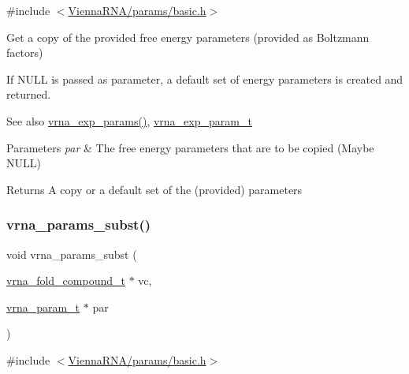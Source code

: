 {\ttfamily \#include $<$\mbox{\hyperlink{params_2basic_8h}{Vienna\+R\+N\+A/params/basic.\+h}}$>$}



Get a copy of the provided free energy parameters (provided as Boltzmann factors) 

If N\+U\+LL is passed as parameter, a default set of energy parameters is created and returned.

\begin{DoxySeeAlso}{See also}
\mbox{\hyperlink{group__energy__parameters_gab1f3016f96aa96bff020cdd904605afa}{vrna\+\_\+exp\+\_\+params()}}, \mbox{\hyperlink{group__energy__parameters_ga01d8b92fe734df8d79a6169482c7d8d8}{vrna\+\_\+exp\+\_\+param\+\_\+t}}
\end{DoxySeeAlso}

\begin{DoxyParams}{Parameters}
{\em par} & The free energy parameters that are to be copied (Maybe N\+U\+LL) \\
\hline
\end{DoxyParams}
\begin{DoxyReturn}{Returns}
A copy or a default set of the (provided) parameters 
\end{DoxyReturn}
\mbox{\label{group__energy__parameters_ga5d1909208f7ea3baa98b75afaa1f62ca}} 
\subsubsection{\texorpdfstring{vrna\_params\_subst()}{vrna\_params\_subst()}}
{\footnotesize\ttfamily void vrna\+\_\+params\+\_\+subst (\begin{DoxyParamCaption}\item[{\mbox{\hyperlink{group__fold__compound_ga1b0cef17fd40466cef5968eaeeff6166}{vrna\+\_\+fold\+\_\+compound\+\_\+t}} $\ast$}]{vc,  }\item[{\mbox{\hyperlink{group__energy__parameters_ga8a69ca7d787e4fd6079914f5343a1f35}{vrna\+\_\+param\+\_\+t}} $\ast$}]{par }\end{DoxyParamCaption})}



{\ttfamily \#include $<$\mbox{\hyperlink{params_2basic_8h}{Vienna\+R\+N\+A/params/basic.\+h}}$>$}



